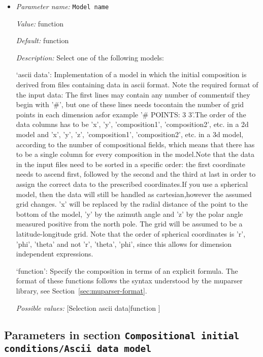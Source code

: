 \begin{itemize}
\item {\it Parameter name:} {\tt Model name}
\label{parameters:Compositional initial conditions/Model name}


{\it Value:} function


{\it Default:} function


{\it Description:} Select one of the following models:

`ascii data': Implementation of a model in which the initial composition is derived from files containing data in ascii format. Note the required format of the input data: The first lines may contain any number of commentsif they begin with '#', but one of these lines needs tocontain the number of grid points in each dimension asfor example '# POINTS: 3 3'.The order of the data columns has to be 'x', 'y', 'composition1', 'composition2', etc. in a 2d model and 'x', 'y', 'z', 'composition1', 'composition2', etc. in a 3d model, according to the number of compositional fields, which means that there has to be a single column for every composition in the model.Note that the data in the input files need to be sorted in a specific order: the first coordinate needs to ascend first, followed by the second and the third at last in order to assign the correct data to the prescribed coordinates.If you use a spherical model, then the data will still be handled as cartesian,however the assumed grid changes. 'x' will be replaced by the radial distance of the point to the bottom of the model, 'y' by the azimuth angle and 'z' by the polar angle measured positive from the north pole. The grid will be assumed to be a latitude-longitude grid. Note that the order of spherical coordinates is 'r', 'phi', 'theta' and not 'r', 'theta', 'phi', since this allows for dimension independent expressions. 

`function': Specify the composition in terms of an explicit formula. The format of these functions follows the syntax understood by the muparser library, see Section~\ref{sec:muparser-format}.


{\it Possible values:} [Selection ascii data|function ]
\end{itemize}



\subsection{Parameters in section \tt Compositional initial conditions/Ascii data model}
\label{parameters:Compositional_20initial_20conditions/Ascii_20data_20model}

